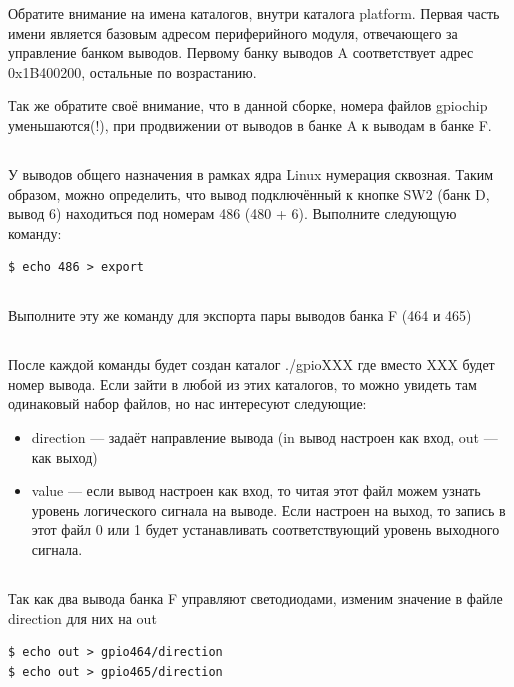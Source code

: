 Обратите внимание на имена каталогов, внутри каталога platform. Первая часть имени является базовым адресом периферийного модуля, отвечающего за управление банком выводов. Первому банку выводов A соответствует адрес 0x1B400200, остальные по возрастанию. 

Так же обратите своё внимание, что в данной сборке, номера файлов gpiochip уменьшаются(!), при продвижении от выводов в банке A к выводам в банке F.

\subsection{} У выводов общего назначения в рамках ядра Linux нумерация сквозная. Таким образом, можно определить, что вывод подключённый к кнопке SW2 (банк D, вывод 6) находиться под номерам 486 (480 + 6). Выполните следующую команду:
\begin{lstlisting}[style=bash]
$ echo 486 > export
\end{lstlisting}

\subsection{} Выполните эту же команду для экспорта пары выводов банка F (464 и 465) 

\subsection{} После каждой команды будет создан каталог ./gpioXXX где вместо XXX будет номер вывода. Если зайти в любой из этих каталогов, то можно увидеть там одинаковый набор файлов, но нас интересуют следующие: 
\begin{itemize}
\item direction — задаёт направление вывода (in вывод настроен как вход, out — как выход)
\item value — если вывод настроен как вход, то читая этот файл можем узнать уровень логического сигнала на выводе. Если настроен на выход, то запись в этот файл 0 или 1 будет устанавливать соответствующий уровень выходного сигнала.
\end{itemize}

\subsection{} Так как два вывода банка F управляют светодиодами, изменим значение в файле direction  для них на out
\begin{lstlisting}[style=bash]
$ echo out > gpio464/direction
$ echo out > gpio465/direction
\end{lstlisting}

